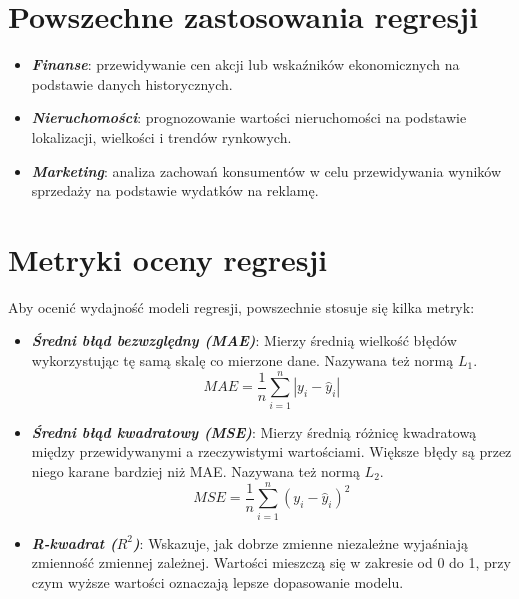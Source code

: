 \section*{Powszechne zastosowania regresji}

\vspace{-1.0em}

\begin{itemize}
    \item \textbf{\textit{Finanse}}: przewidywanie cen akcji lub wskaźników ekonomicznych na podstawie danych historycznych.
    \item \textbf{\textit{Nieruchomości}}: prognozowanie wartości nieruchomości na podstawie lokalizacji, wielkości i trendów rynkowych.
    \item \textbf{\textit{Marketing}}: analiza zachowań konsumentów w celu przewidywania wyników sprzedaży na podstawie wydatków na reklamę.
\end{itemize}

\section*{Metryki oceny regresji \cite{alma991000280759708832}}

\vspace{-1.0em}

Aby ocenić wydajność modeli regresji, powszechnie stosuje się kilka metryk:
\begin{itemize}
    \item \textbf{\textit{Średni błąd bezwzględny (MAE)}}: Mierzy średnią wielkość błędów wykorzystując tę samą skalę co mierzone dane. Nazywana też normą $L_{1}$.
    \[
    MAE = \frac{1}{n} \sum_{i=1}^{n} |y_i - \hat{y}_i|
    \]

    \item \textbf{\textit{Średni błąd kwadratowy (MSE)}}: Mierzy średnią różnicę kwadratową między przewidywanymi a rzeczywistymi wartościami. Większe błędy są przez niego karane bardziej niż MAE. Nazywana też normą $L_{2}$.
    \[
    MSE = \frac{1}{n} \sum_{i=1}^{n} (y_i - \hat{y}_i)^2
    \]

    \item \textbf{\textit{R-kwadrat ($R^2$)}}: Wskazuje, jak dobrze zmienne niezależne wyjaśniają zmienność zmiennej zależnej. Wartości mieszczą się w zakresie od 0 do 1, przy czym wyższe wartości oznaczają lepsze dopasowanie modelu.
\end{itemize}

\clearpage


